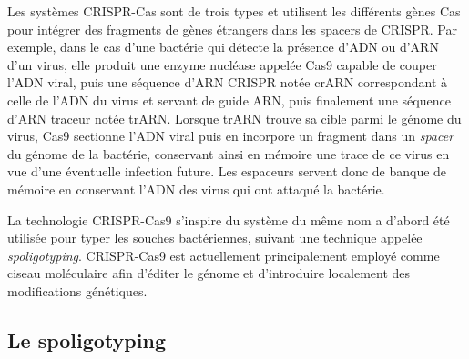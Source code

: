 \documentclass[twoside,a4paper,11pt,frenchb,openany]{report}
\begin{document}
Les systèmes CRISPR-Cas sont de trois types et utilisent les différents gènes Cas pour intégrer des fragments de gènes étrangers dans les spacers de CRISPR. Par exemple, dans le cas d'une bactérie qui détecte la présence d'ADN ou d'ARN d'un virus, elle produit une enzyme nucléase appelée Cas9 capable de couper l'ADN viral, puis une séquence d'ARN CRISPR notée crARN correspondant à celle de l'ADN du virus et servant de guide ARN, puis finalement une séquence d'ARN traceur notée trARN. Lorsque trARN trouve sa cible parmi le génome du virus, Cas9 sectionne l'ADN viral puis en incorpore un fragment dans un \textit{spacer} du génome de la bactérie, conservant ainsi en mémoire une trace de ce virus en vue d'une éventuelle infection future. Les espaceurs servent donc de banque de mémoire en conservant l'ADN des virus qui ont attaqué la bactérie.

La technologie CRISPR-Cas9 s'inspire du système du même nom a d'abord été utilisée pour typer les souches bactériennes, suivant une technique appelée \textit{spoligotyping}. CRISPR-Cas9 est actuellement principalement employé comme ciseau moléculaire afin d'éditer le génome et d'introduire localement des modifications génétiques.


\subsection{Le spoligotyping}
\end{document}
